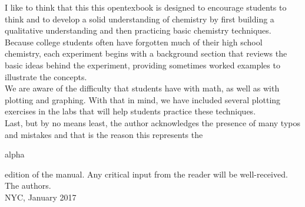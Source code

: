 \documentclass[main.tex]{subfiles}
\begin{document}
\begin{fullwidth}
\begin{multicols*}{2}
	I like to think that this this opentexbook is designed to encourage students to think and to develop a solid understanding of chemistry by first building a qualitative understanding and then practicing basic chemistry techniques. Because college students often have forgotten much of their high school chemistry, each experiment begins with a background section that reviews the basic ideas behind the experiment, providing sometimes worked examples to illustrate the concepts. \\
We are aware of the difficulty that students have with math, as well as with plotting and graphing. With that in mind, we have included several plotting exercises in the labs that will help students practice these techniques. \\
Last, but by no means least, the author acknowledges the presence of many typos and mistakes and that is the reason this represents the \begin{it}alpha \end{it} edition of the manual. Any critical input from the reader will be well-received.\\
The authors.\\
NYC, January 2017

\end{multicols*}
\clearpage\thispagestyle{empty}\mbox{}\clearpage

\end{fullwidth}
\restoregeometry
{}
\end{document}
